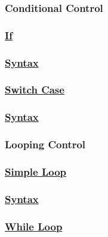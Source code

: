 \vspace{0.25cm}

\subsubsection{Conditional Control}
\newpage
\subsubsection*{\underline{If}} 
\subsubsection*{\underline{Syntax}}




\vspace{0.25cm}

\subsubsection*{\underline{Switch Case}}

\subsubsection*{\underline{Syntax}}



\vspace{0.25cm}

\subsubsection{Looping Control}

\subsubsection*{\underline{Simple Loop}}


\subsubsection*{\underline{Syntax}}






\subsubsection*{\underline{While Loop}}

